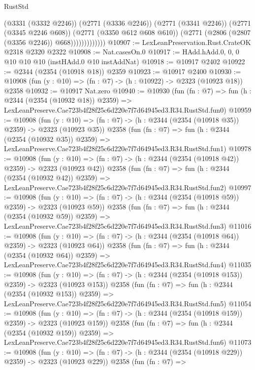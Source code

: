 \begin{lexlean}{RustStd}
\begin{coremodule}
                          (@3331 (@3332 @2246))
                          (@2771 (@3336 @2246))
                          (@2771 (@3341 @2246))
                          (@2771 (@3345 @2246 @608))
                          (@2771 (@3350 @612 @608 @610))
                          (@2771 (@2806 (@2807 (@3356 @2246)) @668)))))))))))))
@10907 := LexLeanPreservation.Rust.CrateOK @2318 @2320 @2322
@10908 := Nat.casesOn.{0}
@10917 := HAdd.hAdd.{0, 0, 0} @10 @10 @10 (instHAdd.{0} @10 instAddNat)
@10918 := @10917 @2402
@10922 := @2344 (@2354 (@10918 @18)) @2359
@10923 := @10917 @2400
@10930 := @10908 (fun (y : @10) => (fn : @7) -> (h : @10922) -> @2323 (@10923 @18)) @2358
@10932 := @10917 Nat.zero
@10940 := @10930
    (fun (fn : @7) =>
    fun (h : @2344 (@2354 (@10932 @18)) @2359) =>
    LexLeanPreserve.Cae723b4f28f25c6d220e7f7d64945ed3.R34.RustStd.fun0)
@10959 := @10908
    (fun (y : @10) => (fn : @7) -> (h : @2344 (@2354 (@10918 @35)) @2359) -> @2323 (@10923 @35))
    @2358
    (fun (fn : @7) =>
    fun (h : @2344 (@2354 (@10932 @35)) @2359) =>
    LexLeanPreserve.Cae723b4f28f25c6d220e7f7d64945ed3.R34.RustStd.fun1)
@10978 := @10908
    (fun (y : @10) => (fn : @7) -> (h : @2344 (@2354 (@10918 @42)) @2359) -> @2323 (@10923 @42))
    @2358
    (fun (fn : @7) =>
    fun (h : @2344 (@2354 (@10932 @42)) @2359) =>
    LexLeanPreserve.Cae723b4f28f25c6d220e7f7d64945ed3.R34.RustStd.fun2)
@10997 := @10908
    (fun (y : @10) => (fn : @7) -> (h : @2344 (@2354 (@10918 @59)) @2359) -> @2323 (@10923 @59))
    @2358
    (fun (fn : @7) =>
    fun (h : @2344 (@2354 (@10932 @59)) @2359) =>
    LexLeanPreserve.Cae723b4f28f25c6d220e7f7d64945ed3.R34.RustStd.fun3)
@11016 := @10908
    (fun (y : @10) => (fn : @7) -> (h : @2344 (@2354 (@10918 @64)) @2359) -> @2323 (@10923 @64))
    @2358
    (fun (fn : @7) =>
    fun (h : @2344 (@2354 (@10932 @64)) @2359) =>
    LexLeanPreserve.Cae723b4f28f25c6d220e7f7d64945ed3.R34.RustStd.fun4)
@11035 := @10908
    (fun (y : @10) => (fn : @7) -> (h : @2344 (@2354 (@10918 @153)) @2359) -> @2323 (@10923 @153))
    @2358
    (fun (fn : @7) =>
    fun (h : @2344 (@2354 (@10932 @153)) @2359) =>
    LexLeanPreserve.Cae723b4f28f25c6d220e7f7d64945ed3.R34.RustStd.fun5)
@11054 := @10908
    (fun (y : @10) => (fn : @7) -> (h : @2344 (@2354 (@10918 @159)) @2359) -> @2323 (@10923 @159))
    @2358
    (fun (fn : @7) =>
    fun (h : @2344 (@2354 (@10932 @159)) @2359) =>
    LexLeanPreserve.Cae723b4f28f25c6d220e7f7d64945ed3.R34.RustStd.fun6)
@11073 := @10908
    (fun (y : @10) => (fn : @7) -> (h : @2344 (@2354 (@10918 @229)) @2359) -> @2323 (@10923 @229))
    @2358
    (fun (fn : @7) =>

\end{coremodule}
\end{lexlean}
